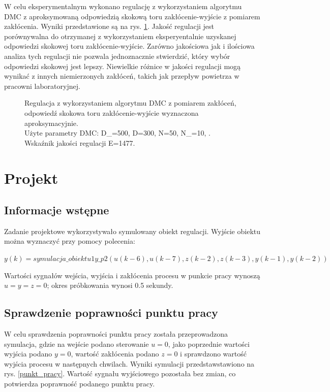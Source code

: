 \documentclass[a4paper,titlepage,11pt,twosides,floatssmall]{mwrep}
\begin{document}
W celu eksperymentalnym wykonano regulację z wykorzystaniem algorytmu DMC z aproksymowaną odpowiedzią skokową toru zakłócenie-wyjście z pomiarem zakłócenia. Wyniki przedstawione są na rys. \ref{kom_s_apro}. Jakość regulacji jest porównywalna do otrzymanej z wykorzystaniem eksperyentalnie uzyskanej odpowiedzi skokowej toru zakłócenie-wyjście. Zarówno jakościowa jak i ilościowa analiza tych regulacji nie pozwala jednoznacznie stwierdzić, który wybór odpowiedzi skokowej jest lepszy. Niewielkie różnice w jakości regulacji mogą wynikać z innych niemierzonych zakłóceń, takich jak przepływ powietrza w pracowni laboratoryjnej.

\begin{figure}[H]
	\centering
	
	\caption{Regulacja z wykorzystaniem algorytmu DMC z pomiarem zakłóceń, odpowiedź skokowa toru zakłócenie-wyjście wyznaczona aproksymacyjnie. \\Użyte parametry DMC: D_{}=500, D=300, N=50, N_{}=10, .\\ Wskaźnik jakości regulacji E=1477.}
	\label{kom_s_apro}
\end{figure}



\chapter{Projekt}
\section{Informacje wstępne}

Zadanie projektowe wykorzystywało symulowany obiekt regulacji. Wyjście obiektu można wyznaczyć przy pomocy polecenia:

$y(k)=symulacja\_obiektu1y\_p2(u(k-6),u(k-7),z(k-2),z(k-3),y(k-1),y(k-2))$

Wartości sygnałów wejścia, wyjścia i zakłócenia procesu w punkcie pracy wynoszą $u = y = z = 0$; okres próbkowania wynosi \num{0,5} sekundy.


\section{Sprawdzenie poprawności punktu pracy}

W celu sprawdzenia poprawności punktu pracy została przeprowadzona symulacja, gdzie na wejście podano sterowanie $u = 0$, jako poprzednie wartości wyjścia podano $y = 0$, wartość zakłócenia podano $z = 0$ i sprawdzono wartość wyjścia procesu w następnych chwilach. Wyniki symulacji przedstawstawiono na rys. \ref{punkt_pracy}. Wartość sygnału wyjściowego pozostała bez zmian, co potwierdza poprawność podanego punktu pracy.
\end{document}
